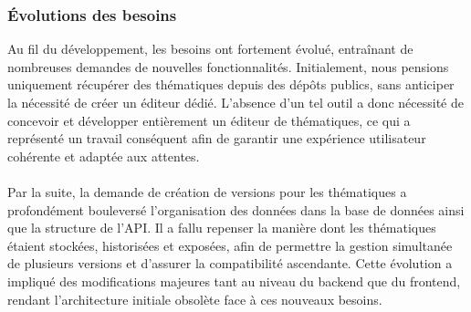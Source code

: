 \documentclass[12pt]{article}
\begin{document}
\subsubsection{Évolutions des besoins}
Au fil du développement, les besoins ont fortement évolué, entraînant de nombreuses demandes de nouvelles fonctionnalités. Initialement, nous pensions uniquement récupérer des thématiques depuis des dépôts publics, sans anticiper la nécessité de créer un éditeur dédié. L'absence d'un tel outil a donc nécessité de concevoir et développer entièrement un éditeur de thématiques, ce qui a représenté un travail conséquent afin de garantir une expérience utilisateur cohérente et adaptée aux attentes.
\\\\
Par la suite, la demande de création de versions pour les thématiques a profondément bouleversé l'organisation des données dans la base de données ainsi que la structure de l'API. Il a fallu repenser la manière dont les thématiques étaient stockées, historisées et exposées, afin de permettre la gestion simultanée de plusieurs versions et d'assurer la compatibilité ascendante. Cette évolution a impliqué des modifications majeures tant au niveau du backend que du frontend, rendant l'architecture initiale obsolète face à ces nouveaux besoins.
\end{document}
